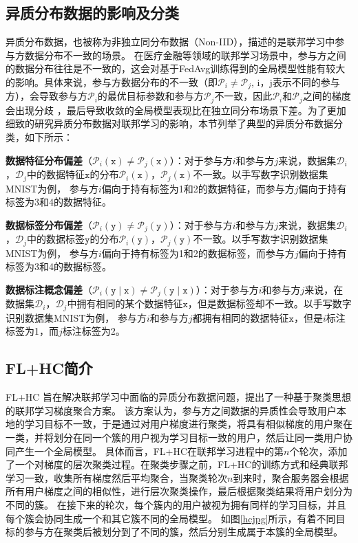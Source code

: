 \subsection{异质分布数据的影响及分类}
异质分布数据，也被称为非独立同分布数据（Non-IID），描述的是联邦学习中参与方数据分布不一致的场景。
在医疗金融等领域的联邦学习场景中，参与方之间的数据分布往往是不一致的，这会对基于FedAvg训练得到的全局模型性能有较大的影响。具体来说，参与方数据分布的不一致（即$\mathcal{P}_i \neq \mathcal{P}_j$, i，j表示不同的参与方），会导致参与方$\mathcal{P}_i$的最优目标参数和参与方$\mathcal{P}_j$不一致，因此$\mathcal{P}_i$和$\mathcal{P}_j$之间的梯度会出现分歧 \cite{kaissis2020secure}，最后导致收敛的全局模型表现比在独立同分布场景下差。为了更加细致的研究异质分布数据对联邦学习的影响，本节列举了典型的异质分布数据分类，如下所示：
\begin{compactitem}
    \item \textbf{数据特征分布偏差}（$\mathcal{P}_i(\mathtt{x}) \neq \mathcal{P}_j(\mathtt{x})$）：对于参与方$i$和参与方$j$来说，数据集$\mathcal{D}_i$，$\mathcal{D}_j$中的数据特征$\mathtt{x}$的分布$\mathcal{P}_i(\mathtt{x})$，$\mathcal{P}_j(\mathtt{x})$不一致。以手写数字识别数据集MNIST为例， 参与方$i$偏向于持有标签为1和2的数据特征，而参与方$j$偏向于持有标签为3和4的数据特征。
    \item \textbf{数据标签分布偏差}（$\mathcal{P}_i(\mathtt{y}) \neq \mathcal{P}_j(\mathtt{y})$）：对于参与方$i$和参与方$j$来说，数据集$\mathcal{D}_i$，$\mathcal{D}_j$中的数据标签$\mathtt{y}$的分布$\mathcal{P}_i(\mathtt{y})$，$\mathcal{P}_j(\mathtt{y})$不一致。以手写数字识别数据集MNIST为例， 参与方$i$偏向于持有标签为1和2的数据标签，而参与方$j$偏向于持有标签为3和4的数据标签。
    \item \textbf{数据标注概念偏差}（$\mathcal{P}_i(\mathtt{y} \mid \mathtt{x}) \neq\mathcal{P}_j(\mathtt{y} \mid \mathtt{x})$）：对于参与方$i$和参与方$j$来说，在数据集$\mathcal{D}_i$，$\mathcal{D}_j$中拥有相同的某个数据特征$\mathtt{x}$，但是数据标签却不一致。以手写数字识别数据集MNIST为例， 参与方$i$和参与方$j$都拥有相同的数据特征$\mathtt{x}$，但是$i$标注标签为1，而$j$标注标签为2。
\end{compactitem}

\subsection{FL+HC简介}
FL+HC \cite{briggs2020federated} 旨在解决联邦学习中面临的异质分布数据问题，提出了一种基于聚类思想的联邦学习梯度聚合方案。
该方案认为，参与方之间数据的异质性会导致用户本地的学习目标不一致，于是通过对用户梯度进行聚类，将具有相似梯度的用户聚在一类，并将划分在同一个簇的用户视为学习目标一致的用户，然后让同一类用户协同产生一个全局模型。
具体而言，FL+HC在联邦学习进程中的第$n$个轮次，添加了一个对梯度的层次聚类过程。在聚类步骤之前，FL+HC的训练方式和经典联邦学习一致，收集所有梯度然后平均聚合，当聚类轮次$n$到来时，聚合服务器会根据所有用户梯度之间的相似性，进行层次聚类操作，最后根据聚类结果将用户划分为不同的簇。
在接下来的轮次，每个簇内的用户被视为拥有同样的学习目标，并且每个簇会协同生成一个和其它簇不同的全局模型。
如图\ref{hcjpg}所示，有着不同目标的参与方在聚类后被划分到了不同的簇，然后分别生成属于本簇的全局模型。

